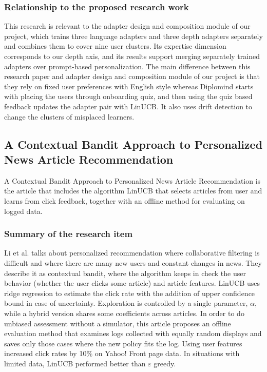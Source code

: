 \documentclass{FastFyp}
\begin{document}
\subsubsection{Relationship to the proposed research work}
This research is relevant to the adapter design and composition module of our project, which trains three language adapters and three depth adapters separately and combines them to cover nine user clusters. Its expertise dimension corresponds to our depth axis, and its results support merging separately trained adapters over prompt-based personalization. The main difference between this research paper and adapter design and composition module of our project is that they rely on fixed user preferences with English style whereas Diplomind starts with placing the users through onboarding quiz, and then using the quiz based feedback updates the adapter pair with LinUCB. It also uses drift detection to change the clusters of misplaced learners.


\subsection{A Contextual Bandit Approach to Personalized News Article Recommendation}
A Contextual Bandit Approach to Personalized News Article Recommendation is the article that includes the algorithm LinUCB that selects articles from user and learns from click feedback, together with an offline method for evaluating on logged data.

\subsubsection{Summary of the research item}
Li et al. \cite{li2010contextual} talks about personalized recommendation where collaborative filtering is difficult and where there are many new users and constant changes in news. They describe it as contextual bandit, where the algorithm keeps in check the user behavior (whether the user clicks some article) and article features. LinUCB uses ridge regression to estimate the click rate with the addition of upper confidence bound in case of uncertainty. Exploration is controlled by a single parameter, $\alpha$, while a hybrid version shares some coefficients across articles. In order to do unbiased assessment without a simulator, this article proposes an offline evaluation method that examines logs collected with equally random displays and saves only those cases where the new policy fits the log. Using user features increased click rates by 10\% on Yahoo! Front page data. In situations with limited data, LinUCB performed better than $\varepsilon$ greedy.
\end{document}
